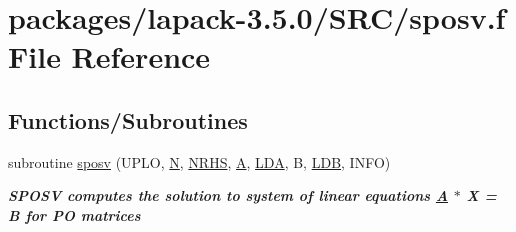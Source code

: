 \hypertarget{sposv_8f}{}\section{packages/lapack-\/3.5.0/\+S\+R\+C/sposv.f File Reference}
\label{sposv_8f}
\subsection*{Functions/\+Subroutines}
\begin{DoxyCompactItemize}
\item 
subroutine \hyperlink{group__realPOsolve_gad46400c796afc8031a8c3ec5481af8c3}{sposv} (U\+P\+L\+O, \hyperlink{polmisc_8c_a0240ac851181b84ac374872dc5434ee4}{N}, \hyperlink{example__user_8c_aa0138da002ce2a90360df2f521eb3198}{N\+R\+H\+S}, \hyperlink{classA}{A}, \hyperlink{example__user_8c_ae946da542ce0db94dced19b2ecefd1aa}{L\+D\+A}, B, \hyperlink{example__user_8c_a50e90a7104df172b5a89a06c47fcca04}{L\+D\+B}, I\+N\+F\+O)
\begin{DoxyCompactList}\small\item\em {\bfseries  S\+P\+O\+S\+V computes the solution to system of linear equations \hyperlink{classA}{A} $\ast$ X = B for P\+O matrices} \end{DoxyCompactList}\end{DoxyCompactItemize}
